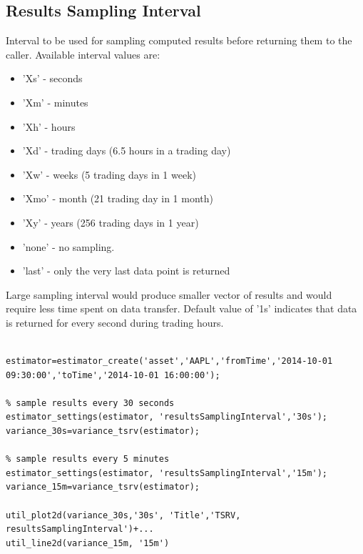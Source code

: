 \documentclass[letterpaper]{report}
\begin{document}
\subsection{Results Sampling Interval}
Interval to be used for sampling computed results before returning them to the caller. 
Available interval values are: 
\begin{itemize} 
  \item 'Xs' - seconds
  \item 'Xm' - minutes
  \item 'Xh' - hours
  \item 'Xd' - trading days (6.5 hours in a trading day)
  \item 'Xw' - weeks (5 trading days in 1 week)
  \item 'Xmo' - month (21 trading day in 1 month)
  \item 'Xy' - years (256 trading days in 1 year)
  \item 'none' - no sampling.
  \item 'last' - only the very last data point is returned  
\end{itemize}
Large sampling interval would produce smaller vector of results and would require less time spent on data transfer. 
Default value of '1s' indicates that data is returned for every second during
trading hours.
\begin{lstlisting}

estimator=estimator_create('asset','AAPL','fromTime','2014-10-01 09:30:00','toTime','2014-10-01 16:00:00');

% sample results every 30 seconds
estimator_settings(estimator, 'resultsSamplingInterval','30s');
variance_30s=variance_tsrv(estimator);

% sample results every 5 minutes
estimator_settings(estimator, 'resultsSamplingInterval','15m');
variance_15m=variance_tsrv(estimator);

util_plot2d(variance_30s,'30s', 'Title','TSRV, resultsSamplingInterval')+...
util_line2d(variance_15m, '15m')
\end{lstlisting}
\end{document}
